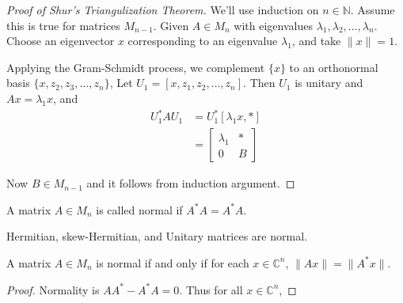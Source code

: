 \begin{proof}[Proof of Shur's Triangulization Theorem]
  We'll use induction on $n \in \mathbb{N}$. Assume this is true for
  matrices $M_{n-1}$. Given $A \in M_n$ with eigenvalues $\lambda_1 ,
  \lambda_2 , \ldots , \lambda_n$. Choose an eigenvector $x$
  corresponding to an eigenvalue $\lambda_1$, and take $\|x\| = 1$.

  Applying the Gram-Schmidt process, we complement $\{x\}$ to an
  orthonormal basis $\{ x, z_2 , z_3 , \ldots , z_n \}$, Let $U_1 = [x,
  z_1 , z_2 , \ldots , z_n]$. Then $U_1$ is unitary and $Ax = \lambda_1 x$, and
  \begin{align*}
    U_1^*AU_1 &= U_1^*[\lambda_1x , *] \\
    &=
    \begin{bmatrix}%
      \lambda_1 & * \\
      0 & B
    \end{bmatrix}
  \end{align*}

  Now $B \in M_{n-1}$ and it follows from induction argument.
\end{proof}

\begin{definition}
  A matrix $A \in M_n$ is called normal if $A^*A = A^*A$.
\end{definition}
\begin{example}
  Hermitian, skew-Hermitian, and Unitary matrices are normal.
\end{example}

\begin{proposition}
  A matrix $A \in M_n$ is normal if and only if for each $x \in
  \mathbb{C}^n$, $\|Ax\| = \|A^*x\|$.
\end{proposition}
\begin{proof}
  Normality is $AA^* - A^*A = 0$. Thus for all $x \in \mathbb{C}^n$,
\end{proof}
